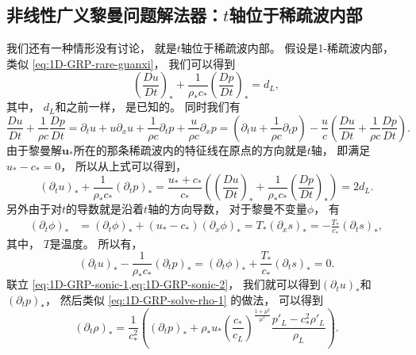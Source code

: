 \subsection{非线性广义黎曼问题解法器：\texorpdfstring{$t$}{t}轴位于稀疏波内部}

我们还有一种情形没有讨论，
就是$t$轴位于稀疏波内部。
假设是1-稀疏波内部，
类似 \cref{eq:1D-GRP-rare-guanxi}，
我们可以得到
\begin{equation}
  \left(\frac{Du}{Dt}\right)_* + \frac{1}{\rho_*c_*} \left(\frac{Dp}{Dt}\right)_* = d_L,
\end{equation}
其中，
$d_L$和之前一样，
是已知的。
同时我们有
\begin{equation}
  \frac{Du}{Dt} + \frac{1}{\rho c}\frac{Dp}{Dt}
  = {\partial_t}u + u {\partial_x}u + \frac{1}{\rho c}{\partial_t}p + \frac{u}{\rho c}{\partial_x}p
  = \left({\partial_t}u + \frac{1}{\rho c}{\partial_t}p\right) - \frac{u}{c}\left(\frac{Du}{Dt} + \frac{1}{\rho c}\frac{Dp}{Dt}\right).
\end{equation}
由于黎曼解${\bm u}_*$所在的那条稀疏波内的特征线在原点的方向就是$t$轴，
即满足$u_*-c_*=0$，
所以从上式可以得到，
\begin{equation}
  \label{eq:1D-GRP-sonic-1}
  \left({\partial_t}u\right)_* + \frac{1}{\rho_* c_*}\left({\partial_t}p\right)_*
  = \frac{u_*+c_*}{c_*}\left(\left(\frac{Du}{Dt}\right)_* + \frac{1}{\rho_*c_*} \left(\frac{Dp}{Dt}\right)_*\right)
  = 2d_L.
\end{equation}
另外由于对$t$的导数就是沿着$t$轴的方向导数，
对于黎曼不变量$\phi$，
有
\begin{equation}
  \begin{aligned}
    \left({\partial_t}\phi\right)_{*} & =\left({\partial_t}\phi\right)_{*}+\left(u_{*}-c_{*}\right)\left({\partial_x}\phi\right)_{*}=T_*\left({\partial_x}s\right)_{*} = -\frac{T_*}{c_*}\left({\partial_t}s\right)_{*},
  \end{aligned}
\end{equation}
其中，
$T$是温度。
所以有，
\begin{equation}
  \label{eq:1D-GRP-sonic-2}
  \left({\partial_t}u\right)_{*}-\frac{1}{\rho_{*} c_{*}}\left({\partial_t}p\right)_{*}=\left({\partial_t}\phi\right)_{*}+\frac{T_*}{c_*}\left({\partial_t}s\right)_{*}=0.
\end{equation}
联立 \cref{eq:1D-GRP-sonic-1,eq:1D-GRP-sonic-2}，
我们就可以得到$\left({\partial_t}u\right)_{*}$和$\left({\partial_t}p\right)_{*}$，
然后类似 \cref{eq:1D-GRP-solve-rho-1} 的做法，
可以得到
\begin{equation}
  \left({\partial_t}\rho\right)_* = \frac{1}{c_{*}^2}\left(\left({\partial_t}p\right)_*+\rho_{*}u_*\left(\frac{c_{*}}{c_L}\right)^\frac{1+\mu^2}{\mu^2}\frac{p'_L-c_*^2\rho'_L}{\rho_L}\right).
\end{equation}

